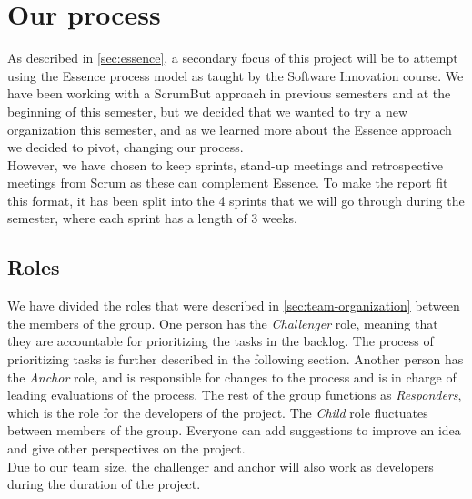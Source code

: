\section{Our process}\label{sprint1:ourprocess}
As described in \autoref{sec:essence}, a secondary focus of this project will be to attempt using the Essence process model as taught by the Software Innovation course.
We have been working with a ScrumBut approach in previous semesters and at the beginning of this semester, but we decided that we wanted to try a new organization this semester, and as we learned more about the Essence approach we decided to pivot, changing our process. \\
However, we have chosen to keep sprints, stand-up meetings and retrospective meetings from Scrum as these can complement Essence.
To make the report fit this format, it has been split into the 4 sprints that we will go through during the semester, where each sprint has a length of 3 weeks.

\subsection{Roles}
We have divided the roles that were described in \autoref{sec:team-organization} between the members of the group.
One person has the \textit{Challenger} role, meaning that they are accountable for prioritizing the tasks in the backlog.
The process of prioritizing tasks is further described in the following section.
Another person has the \textit{Anchor} role, and is responsible for changes to the process and is in charge of leading evaluations of the process.
The rest of the group functions as \textit{Responders}, which is the role for the developers of the project.
The \textit{Child} role fluctuates between members of the group.
Everyone can add suggestions to improve an idea and give other perspectives on the project. \\
Due to our team size, the challenger and anchor will also work as developers during the duration of the project.

